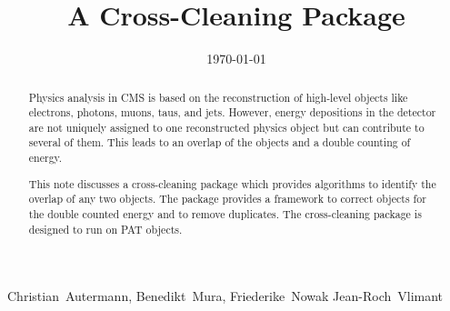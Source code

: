 \documentclass{cmspaper}
\begin{document}

\begin{titlepage}

\date{\today}

\title{A Cross-Cleaning Package}

\begin{Authlist}
    Christian~Autermann, Benedikt~Mura, Friederike~Nowak
    Jean-Roch~Vlimant
\end{Authlist}




\begin{abstract}
Physics analysis in CMS is based on the reconstruction of high-level objects
like electrons, photons, muons, taus, and jets. However, energy depositions in
the detector are not uniquely assigned to one reconstructed physics object but
can contribute to several of them. This leads to an overlap of the objects and
a double counting of energy.

This note discusses a cross-cleaning package which provides algorithms to
identify the overlap of any two objects. The package provides a framework to
correct objects for the double counted energy and to remove duplicates. The
cross-cleaning package is designed to run on {\sc PAT} objects.
\end{abstract} 


\end{titlepage}

\end{document}
